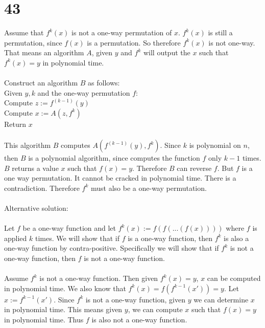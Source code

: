 \documentclass[letterpaper,notitlepage,twoside]{article}
\newcommand\tab[1][1cm]{\hspace*{#1}} %
\begin{document}
\section*{43}
Assume that $f^k(x)$ is not a one-way permutation of $x$. $f^k(x)$ is still a permutation, since $f(x)$ is a permutation. So therefore $f^k(x)$ is not one-way. That means an algorithm $A$, given $y$ and $f^k$ will output the $x$ such that $f^k(x) = y$ in polynomial time. \\\\
Construct an algorithm $B$ as follows: \\
Given $y, k$ and the one-way permutation $f$: \\
\tab Compute $z := f^{(k - 1)}(y)$ \\
\tab Compute $x := A(z, f^k)$ \\
\tab Return $x$\\\\
This algorithm $B$ computes $A(f^{(k - 1)}(y), f^k)$. Since $k$ is polynomial on $n$, then $B$ is a polynomial algorithm, since computes the function $f$ only $k - 1$ times. $B$ returns a value $x$ such that $f(x) = y$. Therefore $B$ can reverse $f$. But $f$ is a one way permutation. It cannot be cracked in polynomial time. There is a contradiction. Therefore $f^k$ must also be a one-way permutation.
\\\\
Alternative solution:
\\\\
Let $f$ be a one-way function and let $f^k(x) := f(f(...(f(x))))$ where $f$ is applied $k$ times. We will show that if $f$ is a one-way function, then $f^k$ is also a one-way function by contra-positive. Specifically we will show that if $f^k$ is not a one-way function, then $f$ is not a one-way function.
\\\\
Assume $f^k$ is not a one-way function. Then given $f^k(x) = y$, $x$ can be computed in polynomial time. We also know that $ f^k(x) = f(f^{k-1}(x')) = y$. Let $x := f^{k-1}(x')$. Since $f^k$ is not a one-way function, given $y$ we can determine $x$ in polynomial time. This means given $y$, we can compute $x$ such that $f(x) = y$ in polynomial time. Thus $f$ is also not a one-way function.
\end{document}
